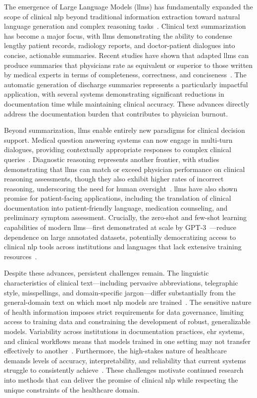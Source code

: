 The emergence of Large Language Models (\glspl{llm}) has fundamentally expanded the scope of clinical \gls{nlp} beyond traditional information extraction toward natural language generation and complex reasoning tasks~\citep{singhal2023large, thirunavukarasu2023large}. Clinical text summarization has become a major focus, with \glspl{llm} demonstrating the ability to condense lengthy patient records, radiology reports, and doctor-patient dialogues into concise, actionable summaries. Recent studies have shown that adapted \glspl{llm} can produce summaries that physicians rate as equivalent or superior to those written by medical experts in terms of completeness, correctness, and conciseness~\citep{vanveen2024adapted}. The automatic generation of discharge summaries represents a particularly impactful application, with several systems demonstrating significant reductions in documentation time while maintaining clinical accuracy. These advances directly address the documentation burden that contributes to physician burnout.

Beyond summarization, \glspl{llm} enable entirely new paradigms for clinical decision support. Medical question answering systems can now engage in multi-turn dialogues, providing contextually appropriate responses to complex clinical queries~\citep{singhal2023large}. Diagnostic reasoning represents another frontier, with studies demonstrating that \glspl{llm} can match or exceed physician performance on clinical reasoning assessments, though they also exhibit higher rates of incorrect reasoning, underscoring the need for human oversight~\citep{cabral2024clinical}. \glspl{llm} have also shown promise for patient-facing applications, including the translation of clinical documentation into patient-friendly language, medication counseling, and preliminary symptom assessment. Crucially, the zero-shot and few-shot learning capabilities of modern \glspl{llm}---first demonstrated at scale by GPT-3~\citep{brown2020language}---reduce dependence on large annotated datasets, potentially democratizing access to clinical \gls{nlp} tools across institutions and languages that lack extensive training resources~\citep{hu2024improving}.

Despite these advances, persistent challenges remain. The linguistic characteristics of clinical text—including pervasive abbreviations, telegraphic style, misspellings, and domain-specific jargon—differ substantially from the general-domain text on which most \gls{nlp} models are trained~\citep{dalianis2018clinical}. The sensitive nature of health information imposes strict requirements for data governance, limiting access to training data and constraining the development of robust, generalizable models. Variability across institutions in documentation practices, \gls{ehr} systems, and clinical workflows means that models trained in one setting may not transfer effectively to another~\citep{wu2022neural}. Furthermore, the high-stakes nature of healthcare demands levels of accuracy, interpretability, and reliability that current systems struggle to consistently achieve~\citep{wu2022neural}. These challenges motivate continued research into methods that can deliver the promise of clinical \gls{nlp} while respecting the unique constraints of the healthcare domain.

